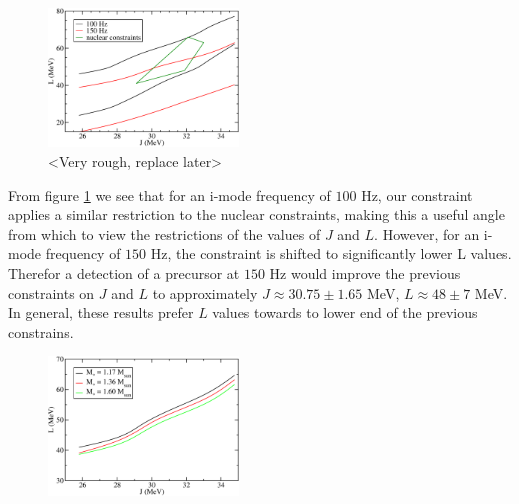 \documentclass[fleqn,usenatbib]{mnras}
\begin{document}
\begin{figure}
\centering
\includegraphics[width=0.45\textwidth,angle=0]{constraints_rough_2}
\caption{<Very rough, replace later>} %
\label{fig:constraints}
\end{figure}

\hspace{\parindent}From figure \ref{fig:constraints} we see that for an i-mode frequency of $100$ Hz, our constraint applies a similar restriction to the nuclear constraints, making this a useful angle from which to view the restrictions of the values of $J$ and $L$. However, for an i-mode frequency of $150$ Hz, the constraint is shifted to significantly lower L values. Therefor a detection of a precursor at $150$ Hz would improve the previous constraints on $J$ and $L$ to approximately $J\approx 30.75\pm 1.65$ MeV, $L\approx 48\pm 7$ MeV. In general, these results prefer $L$ values towards to lower end of the previous constrains.







\begin{figure}
\centering
\includegraphics[width=0.45\textwidth,angle=0]{K40_f150_Mcomp.pdf}
\caption{}
\label{fig:vary_mass_contours}
\end{figure}
\end{document}
